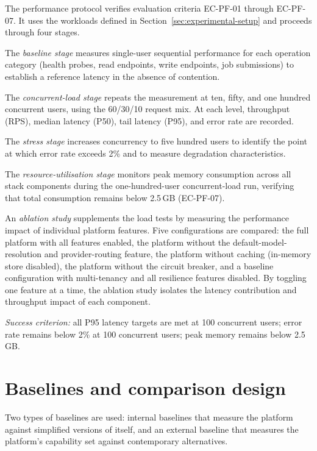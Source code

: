 \documentclass[a4paper]{sapthesis}
\begin{document}
The performance protocol verifies evaluation criteria EC-PF-01 through
EC-PF-07.  It uses the workloads defined in
Section~\ref{sec:experimental-setup} and proceeds through four stages.

The \emph{baseline stage} measures single-user sequential performance for
each operation category (health probes, read endpoints, write endpoints,
job submissions) to establish a reference latency in the absence of
contention.

The \emph{concurrent-load stage} repeats the measurement at ten, fifty,
and one hundred concurrent users, using the 60/30/10 request mix.  At
each level, throughput (RPS), median latency (P50), tail latency (P95),
and error rate are recorded.

The \emph{stress stage} increases concurrency to five hundred users to
identify the point at which error rate exceeds 2\% and to measure
degradation characteristics.

The \emph{resource-utilisation stage} monitors peak memory consumption
across all stack components during the one-hundred-user concurrent-load
run, verifying that total consumption remains below 2.5\,GB (EC-PF-07).

An \emph{ablation study} supplements the load tests by measuring the
performance impact of individual platform features.  Five configurations
are compared: the full platform with all features enabled, the platform
without the default-model-resolution and provider-routing feature, the
platform without caching (in-memory store disabled), the platform without
the circuit breaker, and a baseline configuration with multi-tenancy and
all resilience features disabled.  By toggling one feature at a time, the
ablation study isolates the latency contribution and throughput impact of
each component.

\medskip
\noindent\emph{Success criterion:} all P95 latency targets are met at
100 concurrent users; error rate remains below 2\% at 100 concurrent
users; peak memory remains below 2.5\,GB.


\section{Baselines and comparison design}
\label{sec:baselines}

Two types of baselines are used: internal baselines that measure the
platform against simplified versions of itself, and an external baseline
that measures the platform's capability set against contemporary
alternatives.
\end{document}
